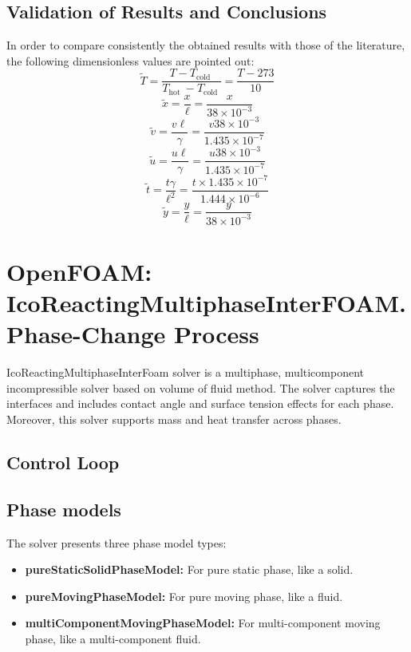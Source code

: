 \subsection{Validation of Results and Conclusions}
In order to compare consistently the obtained results with those of the literature, the following dimensionless values are pointed out:
\begin{equation}
	\tilde{T}=\frac{T-T_{\text {cold }}}{T_{\text {hot }}-T_{\text {cold }}}=\frac{T-273}{10}
	\label{}
\end{equation}
\begin{equation}
	\tilde{x}=\frac{x}{\ell}=\frac{x}{38 \times 10^{-3}}
	\label{}
\end{equation}
\begin{equation}
	\tilde{v}=\frac{v \ell}{\gamma}=\frac{v 38 \times 10^{-3}}{1.435 \times 10^{-7}}
	\label{}
\end{equation}
\begin{equation}
	\tilde{u}=\frac{u \ell}{\gamma}=\frac{u 38 \times 10^{-3}}{1.435 \times 10^{-7}}
	\label{}
\end{equation}
\begin{equation}
	\tilde{t}=\frac{t \gamma}{\ell^{2}}=\frac{t \times 1.435 \times 10^{-7}}{1.444 \times 10^{-6}}
	\label{}
\end{equation}
\begin{equation}
	\tilde{y}=\frac{y}{\ell}=\frac{y}{38 \times 10^{-3}}
	\label{}
\end{equation}
\newpage
\section{OpenFOAM: IcoReactingMultiphaseInterFOAM. Phase-Change Process}
IcoReactingMultiphaseInterFoam solver is a multiphase, multicomponent incompressible solver based on volume of fluid method. The solver captures the interfaces and includes contact angle and surface tension effects for each phase. Moreover, this solver supports mass and heat transfer across phases.
\newline
\subsection{Control Loop}

\subsection{Phase models}
The solver presents three phase model types:
\begin{itemize}
	\item \textbf{pureStaticSolidPhaseModel:} For pure static phase, like a solid.
	\item \textbf{pureMovingPhaseModel:} For pure moving phase, like a fluid.
	\item \textbf{multiComponentMovingPhaseModel:} For multi-component moving phase, like a multi-component fluid.
\end{itemize}
